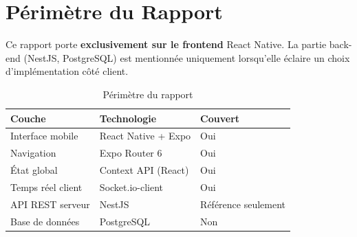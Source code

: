 \section{Périmètre du Rapport}

Ce rapport porte \textbf{exclusivement sur le frontend} React Native. La partie back-end (NestJS, PostgreSQL) est mentionnée uniquement lorsqu'elle éclaire un choix d'implémentation côté client.

\begin{table}[H]
  \centering\small
  \begin{tabular}{@{}lll@{}}
    \toprule
    \textbf{Couche} & \textbf{Technologie} & \textbf{Couvert} \\
    \midrule
    Interface mobile & React Native + Expo & Oui \\
    Navigation & Expo Router 6 & Oui \\
    État global & Context API (React) & Oui \\
    Temps réel client & Socket.io-client & Oui \\
    API REST serveur & NestJS & Référence seulement \\
    Base de données & PostgreSQL & Non \\
    \bottomrule
  \end{tabular}
  \caption{Périmètre du rapport}
\end{table}
